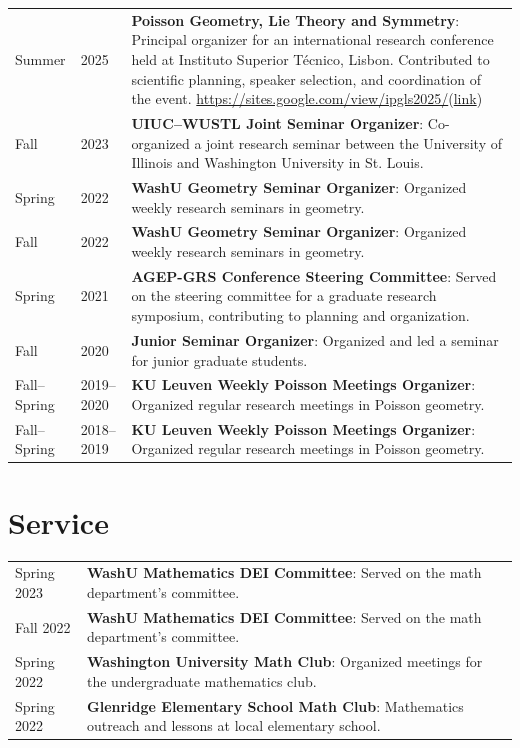\documentclass[margin,line,pifont,palatino,courier]{res}
\begin{document}
\begin{resume}
\begin{tabular}{@{}p{1.2in}p{0.5in}p{3.5in}}
Summer & 2025 & \textbf{Poisson Geometry, Lie Theory and Symmetry}: 
Principal organizer for an international research conference held at Instituto Superior T\'ecnico, Lisbon. Contributed to scientific planning, speaker selection, and coordination of the event. \url{https://sites.google.com/view/ipgls2025/}(\href{https://sites.google.com/view/ipgls2025/}{link}) \\
Fall & 2023 & \textbf{UIUC--WUSTL Joint Seminar Organizer}: 
Co-organized a joint research seminar between the University of Illinois and Washington University in St. Louis. \\
Spring & 2022 & \textbf{WashU Geometry Seminar Organizer}: 
Organized weekly research seminars in geometry. \\
Fall & 2022 & \textbf{WashU Geometry Seminar Organizer}: 
Organized weekly research seminars in geometry. \\
Spring & 2021 & \textbf{AGEP-GRS Conference Steering Committee}: 
Served on the steering committee for a graduate research symposium, contributing to planning and organization. \\
Fall & 2020 & \textbf{Junior Seminar Organizer}: 
Organized and led a seminar for junior graduate students. \\
Fall--Spring & 2019--2020 & \textbf{KU Leuven Weekly Poisson Meetings Organizer}: 
Organized regular research meetings in Poisson geometry. \\
Fall--Spring & 2018--2019 & \textbf{KU Leuven Weekly Poisson Meetings Organizer}: 
Organized regular research meetings in Poisson geometry. \\
\end{tabular}



\section{\sc Service}
\begin{tabular}{@{}p{1.2in}p{3in}}
Spring 2023 & \textbf{WashU Mathematics DEI Committee}: Served on the math department's committee. \\
Fall 2022 & \textbf{WashU Mathematics DEI Committee}: Served on the math department's committee. \\
Spring 2022 & \textbf{Washington University Math Club}: Organized meetings for the undergraduate mathematics club. \\
Spring 2022 & \textbf{Glenridge Elementary School Math Club}: Mathematics outreach and lessons at local elementary school.\\
\end{tabular}


\end{resume}
\end{document}
